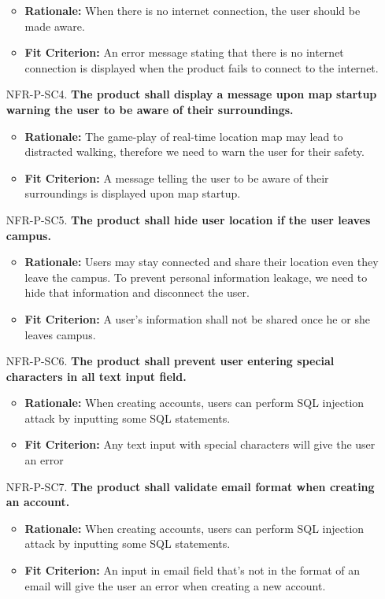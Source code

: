 \documentclass{article}
\begin{document}
\begin{itemize}
    \begin{itemize}
        \item \textbf{Rationale:} When there is no internet connection, the user should be made aware.
        \item \textbf{Fit Criterion:} An error message stating that there is no internet connection is displayed when the product fails to connect to the internet.
    \end{itemize}
    \item[NFR-P-SC4.] \textbf{The product shall display a message upon map startup warning the user to be aware of their surroundings.}
    \begin{itemize}
        \item \textbf{Rationale:} The game-play of real-time location map may lead to distracted walking, therefore we need to warn the user for their safety.
        \item \textbf{Fit Criterion:} A message telling the user to be aware of their surroundings is displayed upon map startup.
    \end{itemize}
    \item[NFR-P-SC5.] \textbf{The product shall hide user location if the user leaves campus.}
    \begin{itemize}
        \item \textbf{Rationale:} Users may stay connected and share their location even they leave the campus. To prevent personal information leakage, we need to hide that information and disconnect the user.
        \item \textbf{Fit Criterion:} A user's information shall not be shared once he or she leaves campus.
    \end{itemize}
    \item[NFR-P-SC6.] \textbf{The product shall prevent user entering special characters in all text input field.}
    \begin{itemize}
        \item \textbf{Rationale:} When creating accounts, users can perform SQL injection attack by inputting some SQL statements.
        \item \textbf{Fit Criterion:} Any text input with special characters will give the user an error
    \end{itemize}
    \item[NFR-P-SC7.] \textbf{The product shall validate email format when creating an account.}
    \begin{itemize}
        \item \textbf{Rationale:} When creating accounts, users can perform SQL injection attack by inputting some SQL statements.
        \item \textbf{Fit Criterion:} An input in email field that's not in the format of an email will give the user an error when creating a new account.
    \end{itemize}
\end{itemize}
\end{document}
